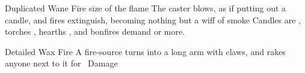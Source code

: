 \ifodd\value{diceNo}

  {Duplicated}%
  {Wane}%
  {Fire}%
  {size of the flame}%
  {The caster blows, as if putting out a candle, and  fires extinguish, becoming nothing but a wiff of smoke}%
  {Candles are \tn[6], torches \tn[7], hearths \tn[8], and bonfires demand \tn[9] or more.}

\else

  {Detailed}%
  {Wax}%
  {Fire}%
  {}%
  {A fire-source turns into a long arm with claws, and rakes anyone next to it for \showDam~Damage}%
  {}

\fi
{}
